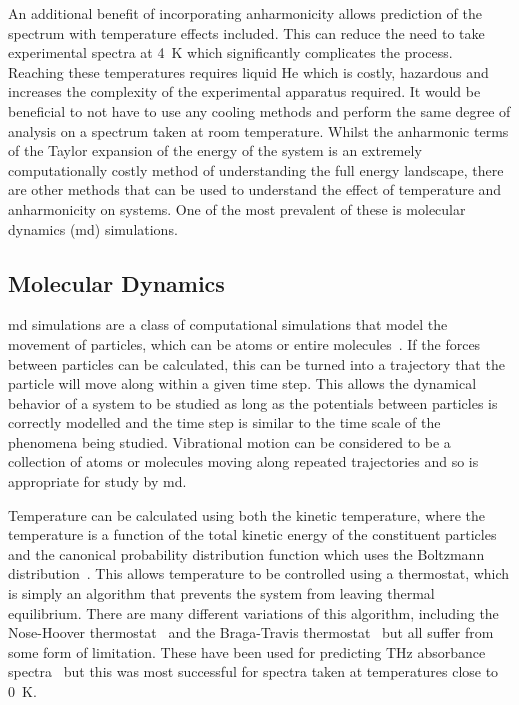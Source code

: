 An additional benefit of incorporating anharmonicity allows prediction of the spectrum with temperature effects included. This can reduce the need to take experimental spectra at \SI{4}{K} which significantly complicates the process. Reaching these temperatures requires liquid He which is costly, hazardous and increases the complexity of the experimental apparatus required. It would be beneficial to not have to use any cooling methods and perform the same degree of analysis on a spectrum taken at room temperature. Whilst the anharmonic terms of the Taylor expansion of the energy of the system is an extremely computationally costly method of understanding the full energy landscape, there are other methods that can be used to understand the effect of temperature and anharmonicity on systems. One of the most prevalent of these is molecular dynamics (\acrshort{md}) simulations.

\subsection{Molecular Dynamics}
\acrshort{md} simulations are a class of computational simulations that model the movement of particles, which can be atoms or entire molecules~\cite{Fermi1955}. If the forces between particles can be calculated, this can be turned into a trajectory that the particle will move along within a given time step. This allows the dynamical behavior of a system to be studied as long as the potentials between particles is correctly modelled and the time step is similar to the time scale of the phenomena being studied. Vibrational motion can be considered to be a collection of atoms or molecules moving along repeated trajectories and so is appropriate for study by \acrshort{md}. 

Temperature can be calculated using both the kinetic temperature, where the temperature is a function of the total kinetic energy of the constituent particles and the canonical probability distribution function which uses the Boltzmann distribution~\cite{Sri2021}. This allows temperature to be controlled using a thermostat, which is simply an algorithm that prevents the system from leaving thermal equilibrium. There are many different variations of this algorithm, including the Nose\nobreakdash-Hoover thermostat~\cite{Braka2003} and the Braga\nobreakdash-Travis thermostat~\cite{Patra2014} but all suffer from some form of limitation. These have been used for predicting THz absorbance spectra~\cite{Dai2020} but this was most successful for spectra taken at temperatures close to \SI{0}{K}. 

